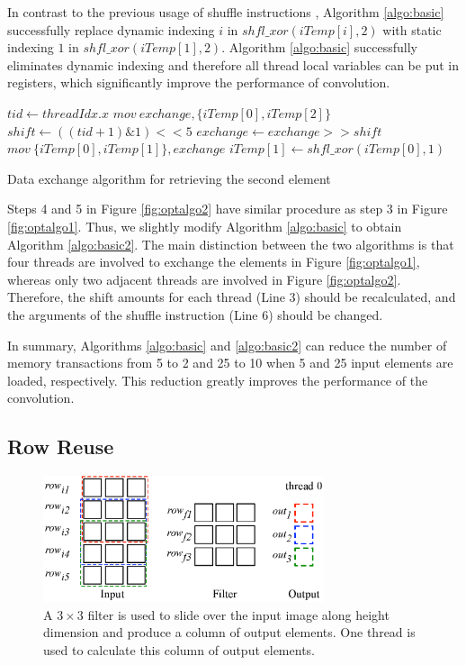 In contrast to the previous usage of shuffle instructions \cite{vasilache2014fast}, Algorithm \ref{algo:basic} successfully replace dynamic
indexing $i$ in $shfl\_xor(iTemp[i],2)$ with static indexing $1$ in $shfl\_xor(iTemp[1],2)$. Algorithm \ref{algo:basic} successfully
eliminates dynamic indexing and therefore all thread local variables can be put in registers, which significantly improve the performance
of convolution.

\begin{algorithm}[t!]
	$tid \gets threadIdx.x$\;
	$mov\ exchange, \{iTemp[0], iTemp[2]\}$\;
	$shift \gets ((tid+1)\&1)<<5$\;
	$exchange \gets exchange >> shift$\;
	$mov\ \{iTemp[0],iTemp[1]\}, exchange$\;
	$iTemp[1] \gets shfl\_xor(iTemp[0],1)$\;	
	\caption{Data exchange algorithm for retrieving the second element}
	\label{algo:basic2}
\end{algorithm}

Steps 4 and 5 in Figure \ref{fig:optalgo2} have similar procedure as step 3 in Figure \ref{fig:optalgo1}. Thus, we slightly modify
Algorithm \ref{algo:basic} to obtain Algorithm \ref{algo:basic2}. The main distinction between the two algorithms is that four threads are involved to exchange the
elements in Figure \ref{fig:optalgo1}, whereas only two adjacent threads are involved in Figure \ref{fig:optalgo2}. Therefore, the shift amounts for each thread (Line 3) should be recalculated, and the arguments of the shuffle instruction (Line 6) should be changed.

In summary, Algorithms \ref{algo:basic} and \ref{algo:basic2} can reduce the number of memory transactions from 5 to 2 and 25 to 10 when 5 and 25 input elements are loaded, respectively. This reduction greatly improves the performance of the convolution.

\subsection{Row Reuse}
\label{sec:rowreuse}
\begin{figure}
	\centering
	\includegraphics[width=\columnwidth,height=3.7cm]{./figure/rowreuse.eps}
\caption{A $3 \times 3$ filter is used to slide over the input image along height dimension and produce a column of output elements. One thread is used to calculate this column of output elements.}
\label{fig:rowreuse}
\end{figure}

